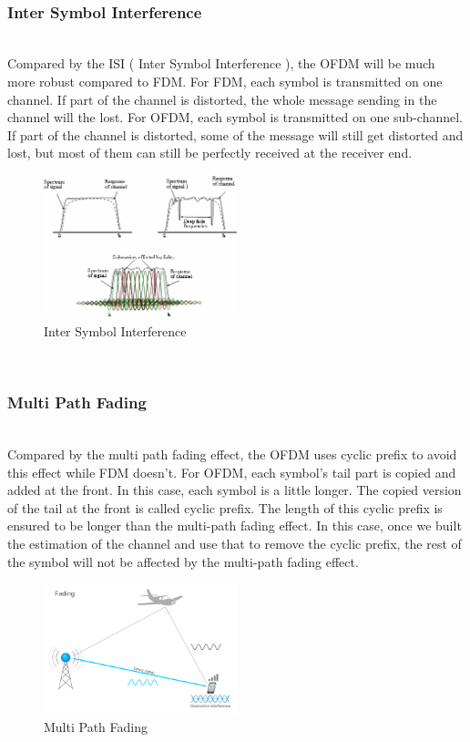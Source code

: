 \documentclass[twocolumn,conference]{IEEEtran}
\begin{document}
    \hfill\\\subsubsection{Inter Symbol Interference}\hfill\\
    \indent Compared by the ISI ( Inter Symbol Interference ), the OFDM will be much more robust compared to FDM. For FDM, each symbol is transmitted on one channel. If part of the channel is distorted, the whole message sending in the channel will the lost. For OFDM, each symbol is transmitted on one sub-channel. If part of the channel is distorted, some of the message will still get distorted and lost, but most of them can still be perfectly received at the receiver end.
    \begin{figure}[h]
        \centering
        \includegraphics[width=0.5\textwidth]{./asset/ISI}
        \caption{Inter Symbol Interference}
        \label{fig:Inter Symbol Interference}
    \end{figure}

    \hfill\\\subsubsection{Multi Path Fading}\hfill\\
    \indent Compared by the multi path fading effect, the OFDM uses cyclic prefix to avoid this effect while FDM doesn’t. For OFDM, each symbol’s tail part is copied and added at the front. In this case, each symbol is a little longer. The copied version of the tail at the front is called cyclic prefix. The length of this cyclic prefix is ensured to be longer than the multi-path fading effect. In this case, once we built the estimation of the channel and use that to remove the cyclic prefix, the rest of the symbol will not be affected by the multi-path fading effect.
    \begin{figure}[h]
        \centering
        \includegraphics[width=0.5\textwidth]{./asset/fading}
        \caption{Multi Path Fading}
        \label{fig:Multi Path Fading}
    \end{figure}
\end{document}
